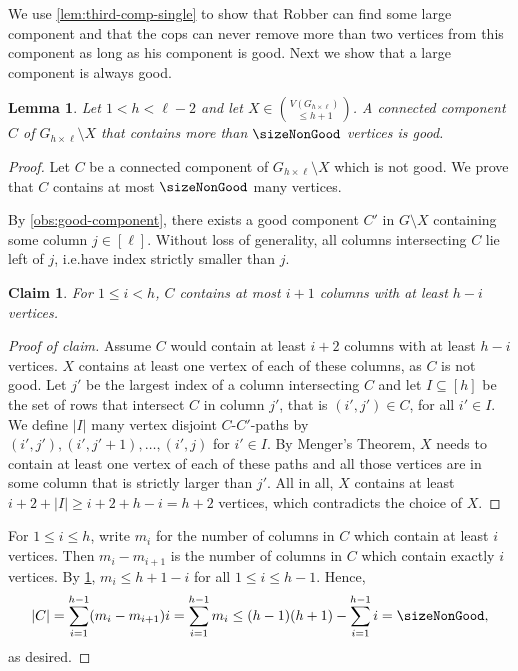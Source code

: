 \documentclass[10pt,a4paper]{article}
\newtheorem{lemma}[theorem]{Lemma}
\newtheorem{claim}[theorem]{Claim}
\newcommand{\grid}[2]{\ensuremath{G_{#1 \times #2}}}
\newenvironment{claimproof}{\begin{proof}[Proof of claim]}{\end{proof}}
\begin{document}
We use \cref{lem:third-comp-single} to show that Robber can find some large component and that the cops can never remove more than two vertices from this component as long as his component is good.
Next we show that a large component is always good.

\begin{lemma}
	\label{lem:size-non-good}
	Let $1<h<\ell-2$ and let $X\in \binom{V(\grid{h}{\ell})}{\leq h+1}$. A connected component $C$ of $\grid{h}{\ell}\setminus X$
	that contains more than $\sizeNonGood$ vertices is good.
\end{lemma}

\begin{proof}
	Let $C$ be a connected component of $\grid{h}{\ell}\setminus X$ which is not good. We prove that $C$ contains at most $\sizeNonGood$ many vertices.
	
	By \cref{obs:good-component}, there exists a good component $C'$ in $G \setminus X$ containing some column $j \in [\ell]$. Without loss of generality, all columns intersecting $C$ lie left of $j$, i.e.\@ have index strictly smaller than $j$.
	
	\begin{claim} \label{cl:size-non-good}
		For $1\leq i<h$,
		$C$ contains at most $i+1$ columns with at least $h-i$ vertices.
	\end{claim}
	\begin{claimproof}
		Assume $C$ would contain at least $i+2$ columns with at least $h-i$ vertices.
		$X$ contains at least one vertex of each of these columns, as $C$ is not good.
		Let $j'$ be the largest index of a column intersecting $C$ and let $I \subseteq [h]$ be the set of rows that intersect $C$ in column $j'$, that is $(i',j')\in C$, for all $i'\in I$.
		We define $|I|$ many vertex disjoint $C$-$C'$-paths by $(i',j'),(i',j'+1),\ldots,(i',j)$ for $i' \in I$.
		By Menger's Theorem, $X$ needs to contain at least one vertex of each of these paths and all those vertices are in some column that is strictly larger than $j'$.
		All in all, $X$ contains at least $i+2+|I|\geq i+2+h-i=h+2$ vertices, which contradicts the choice of $X$.
	\end{claimproof}
	
	For $1 \leq i \leq h$, write $m_i$ for the number of columns in $C$ which contain at least $i$ vertices. Then $m_i - m_{i+1}$ is the number of columns in $C$ which contain exactly $i$ vertices. 
	By \cref{cl:size-non-good}, $m_i \leq h +1 - i$ for all $1 \leq i \leq h-1$.
	Hence,
	\[
		|C| = \sum_{i = 1}^{h-1} (m_i - m_{i+1}) i = \sum_{i=1}^{h-1} m_i \leq (h-1)(h+1) - \sum_{i=1}^{h-1} i = \sizeNonGood,
	\]
	as desired.
\end{proof}
\end{document}
